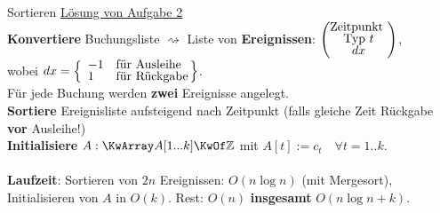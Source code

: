 \begin{frame}{Sortieren}
	\underline{Lösung von Aufgabe 2} \\
	\vspace{-.6\baselineskip} \textbf{Konvertiere} Buchungsliste $\rightsquigarrow$ Liste von \textbf{Ereignissen}: $\left(\stackedtight{\text{Zeitpunkt } \\ \text{Typ }t \\ dx}\right)$, \\ 
	\vspace{-.8\baselineskip} wobei $dx = \tight{\caseslr{-1 & \text{für Ausleihe} \\ 1 & \text{für Rückgabe}}}$. \\
	\impl Für jede Buchung werden \textbf{zwei} Ereignisse angelegt. \\
	\textbf{Sortiere} Ereignisliste aufsteigend nach Zeitpunkt (falls gleiche Zeit \impl Rückgabe \textbf{vor} Ausleihe!) \\
	\textbf{Initialisiere} $A: \KwArray A[1...k] \KwOf \Z$ \quad mit \quad  $A[t] := c_t \quad \forall t=1..k$. \\
	\Return{\KwTrue}  \\
	\textbf{Laufzeit}: Sortieren von $2n$ Ereignissen: $O(n \log n)$ (mit Mergesort), Initialisieren von $A$ in $O(k)$. Rest: $O(n)$ \Impl \textbf{insgesamt} $O(n \log n + k)$.
	
	
\end{frame}

\iffalse
 
\begin{frame}
	\begin{tikzpicture}[remember picture,overlay]
	\node[xshift=-1cm,yshift=-4.4cm] at (current page.north) {\texttt{[image: xkcd\_ineffective\_sorts\_2x]}};
	\end{tikzpicture}
\end{frame}

\fi 

